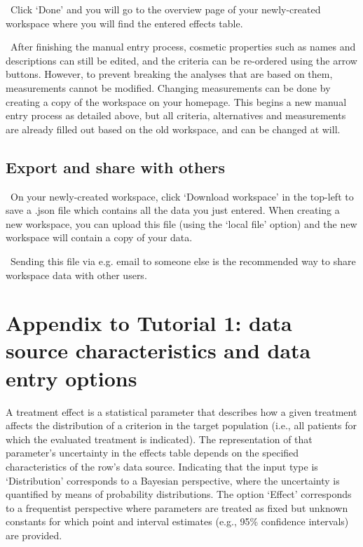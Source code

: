 \documentclass[00_mcda_tutorial.tex]{subfiles}
\begin{document}
\noindent \leftpointright \, Click ‘Done’ and you will go to the overview page of your newly-created workspace where you will find the entered effects table.
\newline

\noindent \faGraduationCap \, After finishing the manual entry process, cosmetic properties such as names and descriptions can still be edited, and the criteria can be re-ordered using the arrow buttons. However, to prevent breaking the analyses that are based on them, measurements cannot be modified. Changing measurements can be done by creating a copy of the workspace on your homepage. This begins a new manual entry process as detailed above, but all criteria, alternatives and measurements are already filled out based on the old workspace, and can be changed at will.

\subsection*{Export and share with others}
\noindent \leftpointright \, On your newly-created workspace, click ‘Download workspace’ in the top-left to save a .json file which contains all the data you just entered. When creating a new workspace, you can upload this file (using the ‘local file’ option) and the new workspace will contain a copy of your data.
\newline

\noindent \faLightbulbO \, Sending this file via e.g. email to someone else is the recommended way to share workspace data with other users.
\clearpage





\section*{Appendix to Tutorial 1: data source characteristics and data entry options}
\label{appendix1}

A treatment effect is a statistical parameter that describes how a given treatment affects the distribution of a criterion in the target population (i.e., all patients for which the evaluated treatment is indicated). The representation of that parameter’s uncertainty in the effects table depends on the specified characteristics of the row’s data source. Indicating that the input type is ‘Distribution’ corresponds to a Bayesian perspective, where the uncertainty is quantified by means of probability distributions. The option ‘Effect’ corresponds to a frequentist perspective where parameters are treated as fixed but unknown constants for which point and interval estimates (e.g., 95\% confidence intervals) are provided.
\end{document}
